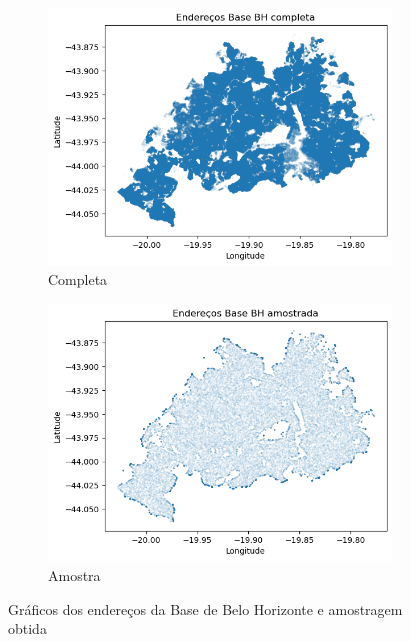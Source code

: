 \begin{figure}[ht]
    \centering
    \begin{subfigure}[b]{0.45\textwidth}
      \includegraphics[width=\textwidth]{Figuras/baseBhToda.png}
      \caption{Completa}
      \label{fig:baseBhC}
    \end{subfigure}
    \hfill
    \begin{subfigure}[b]{0.45\textwidth}
      \includegraphics[width=\textwidth]{Figuras/baseBhAmostra.png}
      \caption{Amostra}
      \label{fig:baseBhA}
    \end{subfigure}
    \caption{Gráficos dos endereços da Base de Belo Horizonte e amostragem obtida}
    \label{fig:baseBh}
  \end{figure}


